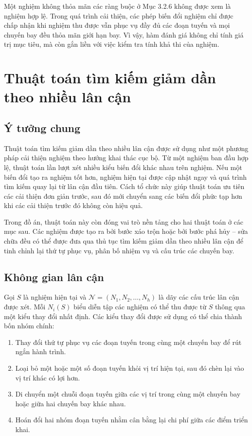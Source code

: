 Một nghiệm không thỏa mãn các ràng buộc ở Mục 3.2.6 không được xem là nghiệm hợp lệ. Trong quá trình cải thiện, các phép biến đổi nghiệm chỉ được chấp nhận khi nghiệm thu được vẫn phục vụ đầy đủ các đoạn tuyến và mọi chuyến bay đều thỏa mãn giới hạn bay. Vì vậy, hàm đánh giá không chỉ tính giá trị mục tiêu, mà còn gắn liền với việc kiểm tra tính khả thi của nghiệm.



\section{Thuật toán tìm kiếm giảm dần theo nhiều lân cận}

\subsection{Ý tưởng chung}

Thuật toán tìm kiếm giảm dần theo nhiều lân cận được sử dụng như một phương pháp cải thiện nghiệm theo hướng khai thác cục bộ. Từ một nghiệm ban đầu hợp lệ, thuật toán lần lượt xét nhiều kiểu biến đổi khác nhau trên nghiệm. Nếu một biến đổi tạo ra nghiệm tốt hơn, nghiệm hiện tại được cập nhật ngay và quá trình tìm kiếm quay lại từ lân cận đầu tiên. Cách tổ chức này giúp thuật toán ưu tiên các cải thiện đơn giản trước, sau đó mới chuyển sang các biến đổi phức tạp hơn khi các cải thiện trước đó không còn hiệu quả.

Trong đồ án, thuật toán này còn đóng vai trò nền tảng cho hai thuật toán ở các mục sau. Các nghiệm được tạo ra bởi bước xáo trộn hoặc bởi bước phá hủy -- sửa chữa đều có thể được đưa qua thủ tục tìm kiếm giảm dần theo nhiều lân cận để tinh chỉnh lại thứ tự phục vụ, phân bố nhiệm vụ và cấu trúc các chuyến bay.

\subsection{Không gian lân cận}

Gọi $S$ là nghiệm hiện tại và $\mathcal{N}=(N_1,N_2,\ldots,N_h)$ là dãy các cấu trúc lân cận được xét. Mỗi $N_i(S)$ biểu diễn tập các nghiệm có thể thu được từ $S$ thông qua một kiểu thay đổi nhất định. Các kiểu thay đổi được sử dụng có thể chia thành bốn nhóm chính:
\begin{enumerate}[leftmargin=1.2cm]
    \item Thay đổi thứ tự phục vụ các đoạn tuyến trong cùng một chuyến bay để rút ngắn hành trình.
    \item Loại bỏ một hoặc một số đoạn tuyến khỏi vị trí hiện tại, sau đó chèn lại vào vị trí khác có lợi hơn.
    \item Di chuyển một chuỗi đoạn tuyến giữa các vị trí trong cùng một chuyến bay hoặc giữa hai chuyến bay khác nhau.
    \item Hoán đổi hai nhóm đoạn tuyến nhằm cân bằng lại chi phí giữa các điểm triển khai.
\end{enumerate}

